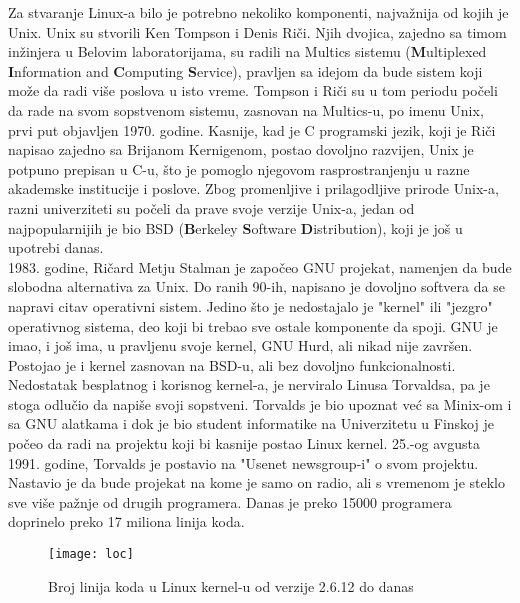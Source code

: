 \indent Za stvaranje Linux-a bilo je potrebno nekoliko komponenti, najvažnija od kojih je Unix. Unix su stvorili Ken Tompson i Denis Riči. Njih dvojica, zajedno sa timom inžinjera u Belovim laboratorijama, su radili na Multics sistemu (\textbf{M}ultiplexed \textbf{I}nformation and \textbf{C}omputing \textbf{S}ervice), pravljen sa idejom da bude sistem koji može da radi više poslova u isto vreme. Tompson i Riči su u  tom periodu počeli da rade na svom sopstvenom sistemu, zasnovan na Multics-u, po imenu Unix, prvi put objavljen 1970. godine. Kasnije, kad je C programski jezik, koji je Riči napisao zajedno sa Brijanom Kernigenom, postao dovoljno razvijen, Unix je potpuno prepisan u C-u, što je pomoglo njegovom rasprostranjenju u razne akademske institucije i poslove. Zbog promenljive i prilagodljive prirode Unix-a, razni univerziteti su počeli da prave svoje verzije Unix-a, jedan od najpopularnijih je bio BSD (\textbf{B}erkeley \textbf{S}oftware \textbf{D}istribution), koji je još u upotrebi danas.\\

1983. godine, Ričard Metju Stalman je započeo GNU projekat, namenjen da bude slobodna alternativa za Unix. Do ranih 90-ih, napisano je dovoljno softvera da se napravi citav operativni sistem. Jedino što je nedostajalo je "kernel" ili "jezgro" operativnog sistema, deo koji bi trebao sve ostale komponente da spoji. GNU je imao, i još ima, u pravljenu svoje kernel, GNU Hurd, ali nikad nije završen. Postojao je i kernel zasnovan na BSD-u, ali bez dovoljno funkcionalnosti.\\

Nedostatak besplatnog i korisnog kernel-a, je nerviralo Linusa Torvaldsa, pa je stoga odlučio da napiše svoji sopstveni. Torvalds je bio upoznat već sa Minix-om i sa GNU alatkama i dok je bio student informatike na Univerzitetu u Finskoj je počeo da radi na projektu koji bi kasnije postao Linux kernel. 25.-og avgusta 1991. godine, Torvalds je postavio na "Usenet newsgroup-i" o svom projektu. Nastavio je da bude projekat na kome je samo on radio, ali s vremenom je steklo sve više pažnje od drugih programera. Danas je preko 15000 programera  doprinelo preko 17 miliona linija koda.
\newpage
\begin{figure}[h]
	\centering
    \qquad
\end{figure}
\begin{figure}[h]
	\centering
    \qquad
\end{figure}
\begin{figure}[H]
	\centering
	\texttt{[image: loc]}
	\caption{Broj linija koda u Linux kernel-u od verzije 2.6.12 do danas}
\end{figure}
\newpage